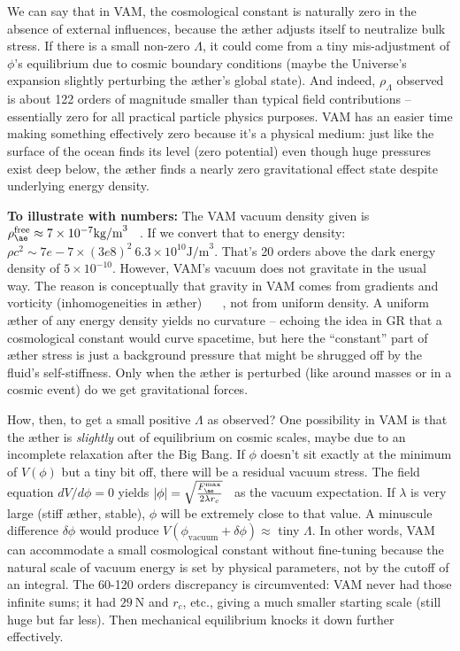 \documentclass[a4paper, aps,preprint,superscriptaddress, 12pt]{revtex4}
\begin{document}
We can say that in VAM, the cosmological constant is naturally zero in the absence of external influences, because the æther adjusts itself to neutralize bulk stress. If there is a small non-zero $\Lambda$, it could come from a tiny mis-adjustment of $\phi$’s equilibrium due to cosmic boundary conditions (maybe the Universe’s expansion slightly perturbing the æther’s global state). And indeed, $\rho_\Lambda$ observed is about 122 orders of magnitude smaller than typical field contributions – essentially zero for all practical particle physics purposes. VAM has an easier time making something effectively zero because it’s a physical medium: just like the surface of the ocean finds its level (zero potential) even though huge pressures exist deep below, the æther finds a nearly zero gravitational effect state despite underlying energy density.


\textbf{To illustrate with numbers:} The VAM vacuum density given is $\rho_{\ae}^{\text{free}}\approx7\times10^{-7}\text{kg/m}^3$~\cite{VAM_constants} . If we convert that to energy density: $\rho c^2 \sim 7e-7 \times (3e8)^2 ~ 6.3\times10^{10}\text{J/m}^3$.
That’s 20 orders above the dark energy density of $5\times10^{-10}$. However, VAM’s vacuum does not gravitate in the usual way. The reason is conceptually that gravity in VAM comes from gradients and vorticity (inhomogeneities in æther)~\cite{Iskandarani2025c} ~\cite{Iskandarani2025c} , not from uniform density. A uniform æther of any energy density yields no curvature – echoing the idea in GR that a cosmological constant would curve spacetime, but here the “constant” part of æther stress is just a background pressure that might be shrugged off by the fluid’s self-stiffness. Only when the æther is perturbed (like around masses or in a cosmic event) do we get gravitational forces.


How, then, to get a small positive $\Lambda$ as observed? One possibility in VAM is that the æther is \textit{slightly} out of equilibrium on cosmic scales, maybe due to an incomplete relaxation after the Big Bang. If $\phi$ doesn’t sit exactly at the minimum of $V(\phi)$ but a tiny bit off, there will be a residual vacuum stress. The field equation $dV/d\phi = 0$ yields $|\phi| = \sqrt{\frac{F_{\ae}^{\max}}{2\lambda r_c}}$~\cite{Iskandarani2025c}  as the vacuum expectation. If $\lambda$ is very large (stiff æther, stable), $\phi$ will be extremely close to that value. A minuscule difference $\delta\phi$ would produce $V(\phi_{\text{vacuum}}+\delta\phi) \approx$ tiny $\Lambda$. In other words, VAM can accommodate a small cosmological constant without fine-tuning because the natural scale of vacuum energy is set by physical parameters, not by the cutoff of an integral. The 60-120 orders discrepancy is circumvented: VAM never had those infinite sums; it had $29~\text{N}$ and $r_c$, etc., giving a much smaller starting scale (still huge but far less). Then mechanical equilibrium knocks it down further effectively.
\end{document}

